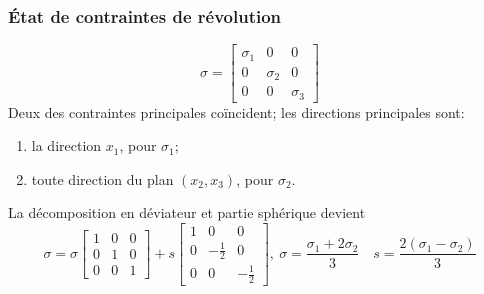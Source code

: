 \subsubsection{État  de  contraintes  de  révolution}
\begin{equation}
    \mathbb{\sigma} = 
    \begin{bmatrix}
        \sigma_1 & 0 & 0 \\
        0 & \sigma_2 & 0 \\
        0 & 0 & \sigma_3
    \end{bmatrix}
    \label{eq:Ch02-018}
\end{equation}
Deux des contraintes principales coïncident; les directions principales sont:
\begin{enumerate}
    \item la direction $x_1$, pour $\sigma_1$;
    \item toute direction du plan $\left( x_2, x_3 \right)$, pour $\sigma_2$.
\end{enumerate}
La décomposition en déviateur et partie sphérique devient 
\begin{equation}
    \mathbb{\sigma} = \sigma 
    \begin{bmatrix}
        1 & 0 & 0\\
        0 & 1 & 0\\
        0 & 0 & 1
    \end{bmatrix}
    +
    s
    \begin{bmatrix}
        1 & 0 & 0\\
        0 & -\frac{1}{2} & 0\\
        0 & 0 & -\frac{1}{2}
    \end{bmatrix},\ 
    \sigma = \frac{\sigma_1 + 2\sigma_2}{3} \quad s = \frac{2\left( \sigma_1 - \sigma_2 \right)}{3}
    \label{eq:Ch02-019}
\end{equation}
